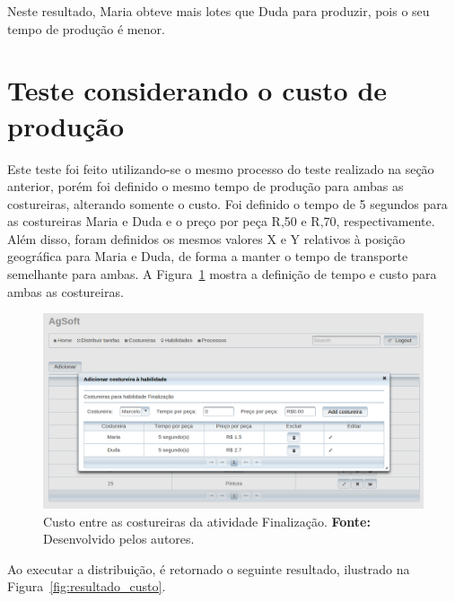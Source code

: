 \par Neste resultado, Maria obteve mais lotes que Duda para produzir, pois o seu
tempo de produção é menor.

\section{Teste considerando o custo de produção}

\par Este teste foi feito utilizando-se o mesmo processo do teste realizado na seção anterior,
porém foi definido o mesmo tempo de produção para ambas as costureiras,
alterando somente o custo. Foi definido o tempo de 5 segundos para as costureiras Maria e Duda e o preço por peça R,50 e R,70, respectivamente. Além disso, foram definidos os mesmos valores X e Y
relativos à posição geográfica para Maria e Duda, de forma a manter o tempo de
transporte semelhante para ambas.
A Figura~\ref{fig:custo_entre_costureiras} mostra a definição de tempo e custo
para ambas as costureiras.

\begin{figure}[h!]
	\centerline{\includegraphics[width=14.7cm]{./imagens/custo_entre_costureiras_teste2.png}}
	\caption[Custo entre as costureiras da atividade Finalização.]
	{Custo entre as costureiras da atividade Finalização. \textbf{Fonte:}
	Desenvolvido pelos autores.}
	\label{fig:custo_entre_costureiras}
\end{figure}

\par Ao executar a distribuição, é retornado o seguinte resultado, ilustrado na
Figura~\ref{fig:resultado_custo}.



